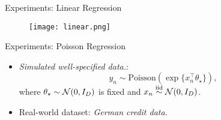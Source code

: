 \documentclass[10pt,xcolor=table]{beamer}
\begin{document}
\begin{frame}{Experiments: Linear Regression}
\begin{figure}
	\centering
\texttt{[image: linear.png]} 
\end{figure}
\end{frame}

\begin{frame}{Experiments: Poisson Regression}
\begin{itemize}
	\item \emph{Simulated well-specified data.}:
\begin{equation*}
	\label{eq: poission regression model}
	y_{n} \sim \text{Poisson}(\exp\{x_{n}^{\top}\theta_{\star}\}),
\end{equation*}
	where $\theta_{\star} \sim \mathcal{N}(0, I_{D})$ is fixed and $x_{n} \overset{\text{iid}}{\sim} \mathcal{N}(0, I_{D})$.
	\item Real-world dataset: \emph{German credit data.}
\end{itemize}
\end{frame}
\end{document}
